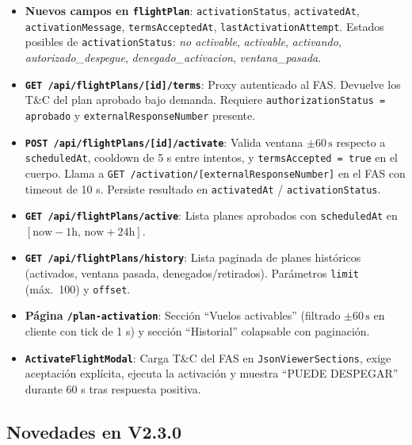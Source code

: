 \documentclass[12pt,a4paper]{article}
\begin{document}
\begin{itemize}
  \item \textbf{Nuevos campos en \texttt{flightPlan}}: \texttt{activationStatus}, \texttt{activatedAt}, \texttt{activationMessage}, \texttt{termsAcceptedAt}, \texttt{lastActivationAttempt}. Estados posibles de \texttt{activationStatus}: \textit{no activable}, \textit{activable}, \textit{activando}, \textit{autorizado\_despegue}, \textit{denegado\_activacion}, \textit{ventana\_pasada}.
  \item \textbf{\texttt{GET /api/flightPlans/[id]/terms}}: Proxy autenticado al FAS. Devuelve los T\&C del plan aprobado bajo demanda. Requiere \texttt{authorizationStatus = aprobado} y \texttt{externalResponseNumber} presente.
  \item \textbf{\texttt{POST /api/flightPlans/[id]/activate}}: Valida ventana $\pm 60\,\text{s}$ respecto a \texttt{scheduledAt}, cooldown de 5 s entre intentos, y \texttt{termsAccepted = true} en el cuerpo. Llama a \texttt{GET /activation/[externalResponseNumber]} en el FAS con timeout de 10 s. Persiste resultado en \texttt{activatedAt} / \texttt{activationStatus}.
  \item \textbf{\texttt{GET /api/flightPlans/active}}: Lista planes aprobados con \texttt{scheduledAt} en $[\text{now}-1\text{h},\,\text{now}+24\text{h}]$.
  \item \textbf{\texttt{GET /api/flightPlans/history}}: Lista paginada de planes históricos (activados, ventana pasada, denegados/retirados). Parámetros \texttt{limit} (máx.\ 100) y \texttt{offset}.
  \item \textbf{Página \texttt{/plan-activation}}: Sección ``Vuelos activables'' (filtrado $\pm 60\,\text{s}$ en cliente con tick de 1 s) y sección ``Historial'' colapsable con paginación.
  \item \textbf{\texttt{ActivateFlightModal}}: Carga T\&C del FAS en \texttt{JsonViewerSections}, exige aceptación explícita, ejecuta la activación y muestra ``PUEDE DESPEGAR'' durante 60 s tras respuesta positiva.
\end{itemize}

\subsection*{Novedades en V2.3.0}
\end{document}
